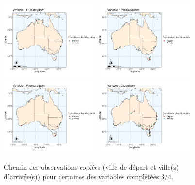 \documentclass{article}
\begin{document}
\begin{figure}[htp]
    \centering
    \includegraphics[width=0.45\textwidth]{Images/Australia_map_segments_complete/Australia_map_segments_complete-09.png}
    \includegraphics[width=0.45\textwidth]{Images/Australia_map_segments_complete/Australia_map_segments_complete-10.png}
    \includegraphics[width=0.45\textwidth]{Images/Australia_map_segments_complete/Australia_map_segments_complete-11.png}
    \includegraphics[width=0.45\textwidth]{Images/Australia_map_segments_complete/Australia_map_segments_complete-12.png}
    \caption{Chemin des observations copiées (ville de départ et ville(s) d'arrivée(s)) pour certaines des variables complétées 3/4.}
    \label{fig:path_data3}
\end{figure}
\end{document}
